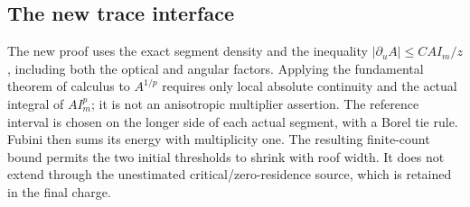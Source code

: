 

\subsection{The new trace interface}
The new proof uses the exact segment density and the inequality
$|\partial_u A|\le CAI_m/z$, including both the optical and angular
factors. Applying the fundamental theorem of calculus to $A^{1/p}$
requires only local absolute continuity and the actual integral of
$AI_m^p$; it is not an anisotropic multiplier assertion. The reference
interval is chosen on the longer side of each actual segment, with a
Borel tie rule. Fubini then sums its energy with multiplicity one.
The resulting finite-count bound permits the two initial thresholds
to shrink with roof width. It does not extend through the unestimated
critical/zero-residence source, which is retained in the final charge.
